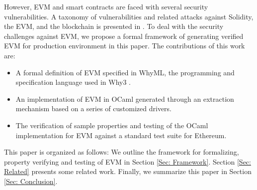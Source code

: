 \documentclass[runningheads]{llncs}
\begin{document}
However, EVM and smart contracts are faced with several security vulnerabilities. %
A taxonomy of vulnerabilities and related attacks against Solidity, the EVM, and the blockchain is presented in \cite{atzei2016survey}. 
To deal with the security challenges against EVM, we propose a formal framework of generating verified EVM for production environment in this paper. The contributions of this work are: 
\begin{itemize}
\item A formal definition of EVM specified in WhyML, the programming and specification language used in Why3 \cite{filliatre2013why3}. 
\item An implementation of EVM in OCaml generated through an extraction mechanism based on a series of customized drivers. 
\item The verification of sample properties and testing of the OCaml implementation for EVM against a standard test suite for Ethereum.
\end{itemize}

This paper is organized as follows: %
We outline the framework for formalizing, property verifying and testing of EVM in Section \ref{Sec: Framework}. %
Section \ref{Sec: Related} presents some related work. Finally, we summarize this paper %
in Section \ref{Sec: Conclusion}.
\end{document}
